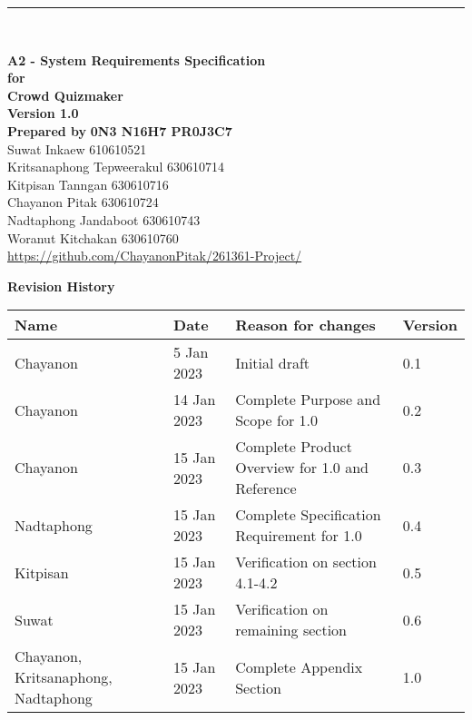 \documentclass[ 10pt]{report}
\begin{document}
    \begin{titlepage}
        \noindent\rule{\textwidth}{5pt} \\
        \begin{flushright}
            \Huge\textbf{A2 - System Requirements Specification} \\[2\baselineskip]
            \large\textbf{for} \\
            \huge\textbf{Crowd Quizmaker} \\[2\baselineskip]
            \large\textbf{Version 1.0} \\[2\baselineskip]
            \large\textbf{Prepared by} \LARGE\textbf{0N3 N16H7 PR0J3C7} \\[0.5\baselineskip]
            \normalsize{
                Suwat Inkaew 610610521 \\
                Kritsanaphong Tepweerakul 630610714 \\
                Kitpisan Tanngan 630610716 \\
                Chayanon Pitak 630610724 \\
                Nadtaphong Jandaboot 630610743 \\
                Woranut Kitchakan 630610760
            } \\[2\baselineskip]
            \large{\href{https://github.com/ChayanonPitak/261361-Project/}{https://github.com/ChayanonPitak/261361-Project/}}
        \end{flushright}
        \pagebreak

        \LARGE\textbf{Revision History} \\[0.5\baselineskip]
        \normalsize{
            \begin{tabular}{| m{8em} | m{6em} | m{20em} | m{5em} |}
                \hline
                \textbf{Name} & \textbf{Date} & \textbf{Reason for changes} & \textbf{Version}\\ 
                \hline\hline
                Chayanon & 5 Jan 2023 & Initial draft & 0.1 \\
                \hline
                Chayanon & 14 Jan 2023 & Complete Purpose and Scope for 1.0 & 0.2 \\
                \hline
                Chayanon & 15 Jan 2023 & Complete Product Overview for 1.0 and Reference & 0.3 \\
                \hline
                Nadtaphong & 15 Jan 2023 & Complete Specification Requirement for 1.0 & 0.4 \\
                \hline
                Kitpisan & 15 Jan 2023 & Verification on section 4.1-4.2 & 0.5 \\
                \hline
                Suwat & 15 Jan 2023 & Verification on remaining section & 0.6 \\
                \hline
                Chayanon, Kritsanaphong, Nadtaphong & 15 Jan 2023 & Complete Appendix Section & 1.0 \\
                \hline
            \end{tabular}
        }
    \end{titlepage}
\end{document}
